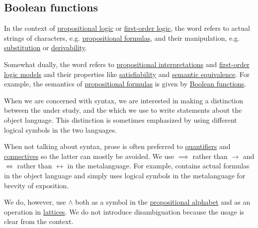 \subsection{Boolean functions}\label{subsec:boolean_functions}

\begin{remark}\label{rem:metalanguage_syntax_and_semantics}
  In the context of \hyperref[subsec:language_of_propositional_logic]{propositional logic} or \hyperref[subsec:language_of_first_order_logic]{first-order logic}, the word  refers to actual strings of characters, e.g. \hyperref[def:propositional_syntax]{propositional formulas}, and their manipulation, e.g. \hyperref[def:propositional_substitution]{substitution} or \hyperref[def:first_order_proofs/derivability]{derivability}.

  Somewhat dually, the word  refers to \hyperref[def:propositional_valuation/interpretation]{propositional interpretations} and \hyperref[def:first_order_semantics/satisfiability]{first-order logic models} and their properties like \hyperref[def:propositional_semantics/satisfiability]{satisfiability} and \hyperref[def:propositional_semantics/equivalence]{semantic equivalence}. For example, the semantics of \hyperref[def:propositional_syntax]{propositional formulas} is given by \hyperref[def:boolean_function]{Boolean functions}.

  When we are concerned with syntax, we are interested in making a distinction between the  under study, and the  which we use to write statements about the object language. This distinction is sometimes emphasized by using different logical symbols in the two languages.

  When not talking about syntax, prose is often preferred to \hyperref[def:first_order_language/quantifiers]{quantifiers} and \hyperref[def:propositional_language/connectives]{connectives} so the latter can mostly be avoided. We use \( \implies \) rather than \( \to \) and \( \iff \) rather than \( \leftrightarrow \) in the metalanguage. For example,  contains actual formulas in the object language and  simply uses logical symbols in the metalanguage for brevity of exposition.

  We do, however, use \( \wedge \) both as a symbol in the \hyperref[def:propositional_language]{propositional alphabet} and as an operation in \hyperref[def:binary_lattice_operations/meet]{lattices}. We do not introduce disambiguation because the usage is clear from the context.


\end{remark}
